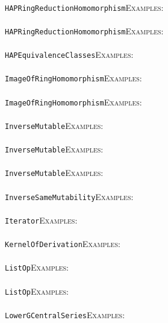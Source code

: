 \documentclass[a4paper,11pt]{report}
\begin{document}
{{ \\
 \texttt{HAPRingReductionHomomorphism}{\nobreakspace}{\nobreakspace}{\nobreakspace}{\nobreakspace}\textsc{Examples:} \\
 \\
 \texttt{HAPRingReductionHomomorphism}{\nobreakspace}{\nobreakspace}{\nobreakspace}{\nobreakspace}\textsc{Examples:} \\
 \\
 \texttt{HAP{\textunderscore}EquivalenceClasses}{\nobreakspace}{\nobreakspace}{\nobreakspace}{\nobreakspace}\textsc{Examples:} \\
 \\
 \texttt{ImageOfRingHomomorphism}{\nobreakspace}{\nobreakspace}{\nobreakspace}{\nobreakspace}\textsc{Examples:} \\
 \\
 \texttt{ImageOfRingHomomorphism}{\nobreakspace}{\nobreakspace}{\nobreakspace}{\nobreakspace}\textsc{Examples:} \\
 \\
 \texttt{InverseMutable}{\nobreakspace}{\nobreakspace}{\nobreakspace}{\nobreakspace}\textsc{Examples:} \\
 \\
 \texttt{InverseMutable}{\nobreakspace}{\nobreakspace}{\nobreakspace}{\nobreakspace}\textsc{Examples:} \\
 \\
 \texttt{InverseMutable}{\nobreakspace}{\nobreakspace}{\nobreakspace}{\nobreakspace}\textsc{Examples:} \\
 \\
 \texttt{InverseSameMutability}{\nobreakspace}{\nobreakspace}{\nobreakspace}{\nobreakspace}\textsc{Examples:} \\
 \\
 \texttt{Iterator}{\nobreakspace}{\nobreakspace}{\nobreakspace}{\nobreakspace}\textsc{Examples:} \\
 \\
 \texttt{KernelOfDerivation}{\nobreakspace}{\nobreakspace}{\nobreakspace}{\nobreakspace}\textsc{Examples:} \\
 \\
 \texttt{ListOp}{\nobreakspace}{\nobreakspace}{\nobreakspace}{\nobreakspace}\textsc{Examples:} \\
 \\
 \texttt{ListOp}{\nobreakspace}{\nobreakspace}{\nobreakspace}{\nobreakspace}\textsc{Examples:} \\
 \\
 \texttt{LowerGCentralSeries}{\nobreakspace}{\nobreakspace}{\nobreakspace}{\nobreakspace}\textsc{Examples:} \\
}}
\end{document}
